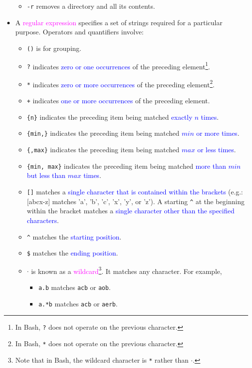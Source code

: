 \documentclass[UTF8]{book}
\newcommand{\code}[1]{\colorbox{codegray}{\texttt{#1}}}
\begin{document}
\begin{itemize}
\begin{itemize}
	\item \code{-r} removes a directory and all its contents.
\end{itemize}
\item A \textcolor{magenta}{regular expression} specifies a set of strings required for a particular purpose. Operators and quantifiers involve:
\begin{itemize}
	\item \code{()} is for grouping.
	\item \code{?} indicates \textcolor{blue}{zero or one occurrences} of the preceding element\footnote{In Bash, \code{?} does not operate on the previous character.}.
	\item \code{*} indicates \textcolor{blue}{zero or more occurrences} of the preceding element\footnote{In Bash, \code{*} does not operate on the previous character.}.
	\item \code{+} indicates \textcolor{blue}{one or more occurrences} of the preceding element.
	\item \code{\{n\}} indicates the preceding item being matched \textcolor{blue}{exactly $n$ times}.
	\item \code{\{min,\}} indicates the preceding item being matched \textcolor{blue}{$min$ or more times}.
	\item \code{\{,max\}} indicates the preceding item being matched \textcolor{blue}{$max$ or less times}.
	\item \code{\{min, max\}} indicates the preceding item being matched \textcolor{blue}{more than $min$ but less than $max$ times}.
	\item \code{{[]}} matches a \textcolor{blue}{single character that is contained within the brackets} (e.g.: {[abcx-z]} matches 'a', 'b', 'c', 'x', 'y', or 'z'). A starting \code{\^{}} at the beginning within the bracket matches a \textcolor{blue}{single character other than the specified characters}.
	\item \code{\^{}} matches the \textcolor{blue}{starting position}.
	\item \code{\$} matches the \textcolor{blue}{ending position}.
	\item \code{$\cdot$} is known as a \textcolor{magenta}{wildcard}\footnote{Note that in Bash, the wildcard character is \code{*} rather than \code{$\cdot$}.}. It matches any character. For example,
	\begin{itemize}
		\item \code{a.b} matches \code{acb} or \code{aob}.
		\item \code{a.*b} matches \code{acb} or \code{aerb}.

\end{itemize}
\end{itemize}
\end{itemize}
\end{document}
